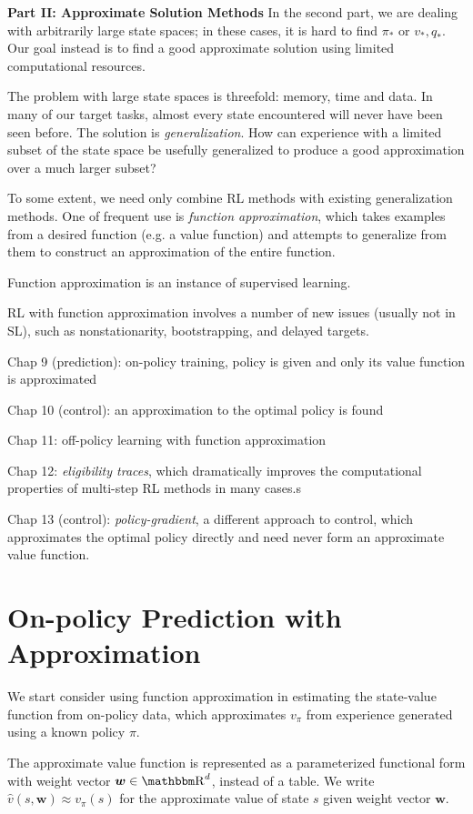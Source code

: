 \documentclass[sutton_barto_notes.tex]{subfiles}
\begin{document}
\newpage
\textbf{Part II: Approximate Solution Methods}
In the second part, we are dealing with arbitrarily large state spaces; in these cases, it is hard to find $\pi_*$ or $v_*, q_*$.
Our goal instead is to find a good approximate solution using limited computational resources.

The problem with large state spaces is threefold: memory, time and data.
In many of our target tasks, almost every state encountered will never have been seen before. The solution is \textit{generalization}.
How can experience with a limited subset of the state space be usefully generalized to produce a good approximation over a much larger subset?

To some extent, we need only combine RL methods with existing  generalization methods. One of frequent use is \textit{function approximation}, which takes examples from a desired function (e.g. a value function) and attempts to generalize from them to construct an approximation of the entire function.

Function approximation is an instance of supervised learning.

RL with function approximation involves a number of new issues (usually not in SL), such as nonstationarity, bootstrapping, and delayed targets.

Chap 9 (prediction): on-policy training, policy is given and only its value function is approximated

Chap 10 (control): an approximation to the optimal policy is found

Chap 11: off-policy learning with function approximation

Chap 12: \textit{eligibility traces}, which dramatically improves the computational properties of multi-step RL methods in many cases.s

Chap 13 (control): \textit{policy-gradient}, a different approach to control, which approximates the optimal policy directly and need never form an approximate value function.

\newpage
\section{On-policy Prediction with Approximation}

We start consider using function approximation in estimating the state-value function from on-policy data, which approximates $v_\pi$ from experience generated using a known policy $\pi$.

The approximate value function is represented as a parameterized functional form with weight vector $\bm{w} \in \R^d$, instead of a table.
We write $\hat{v}(s,\bm{w}) \approx v_\pi(s)$ for the approximate value of state $s$ given weight vector $\bm{w}$.
\end{document}
